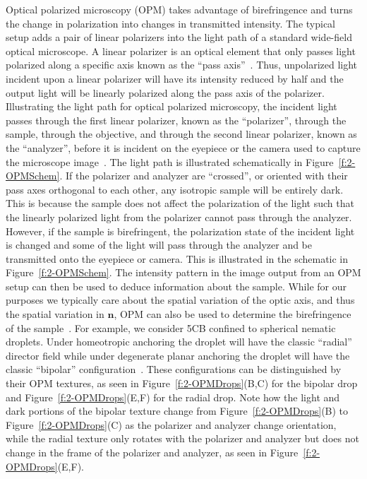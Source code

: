 Optical polarized microscopy (OPM) takes advantage of birefringence and turns the change in polarization into changes in transmitted intensity.
The typical setup adds a pair of linear polarizers into the light path of a standard wide-field optical microscope.
A linear polarizer is an optical element that only passes light polarized along a specific axis known as the ``pass axis''~\cite{RN232}.
Thus, unpolarized light incident upon a linear polarizer will have its intensity reduced by half and the output light will be linearly polarized along the pass axis of the polarizer.
Illustrating the light path for optical polarized microscopy, the incident light passes through the first linear polarizer, known as the ``polarizer'', through the sample, through the objective, and through the second linear polarizer, known as the ``analyzer'', before it is incident on the eyepiece or the camera used to capture the microscope image~\cite{RN232}.
The light path is illustrated schematically in Figure~\ref{f:2-OPMSchem}.
If the polarizer and analyzer are ``crossed'', or oriented with their pass axes orthogonal to each other, any isotropic sample will be entirely dark.
This is because the sample does not affect the polarization of the light such that the linearly polarized light from the polarizer cannot pass through the analyzer.
However, if the sample is birefringent, the polarization state of the incident light is changed and some of the light will pass through the analyzer and be transmitted onto the eyepiece or camera.
This is illustrated in the schematic in Figure~\ref{f:2-OPMSchem}.
The intensity pattern in the image output from an OPM setup can then be used to deduce information about the sample.
While for our purposes we typically care about the spatial variation of the optic axis, and thus the spatial variation in $\mathbf{n}$, OPM can also be used to determine the birefringence of the sample~\cite{RN232}.
For example, we consider 5CB confined to spherical nematic droplets.
Under homeotropic anchoring the droplet will have the classic ``radial'' director field while under degenerate planar anchoring the droplet will have the classic ``bipolar'' configuration~\cite{RN177}.
These configurations can be distinguished by their OPM textures, as seen in Figure~\ref{f:2-OPMDrops}(B,C) for the bipolar drop and Figure~\ref{f:2-OPMDrops}(E,F) for the radial drop.
Note how the light and dark portions of the bipolar texture change from Figure~\ref{f:2-OPMDrops}(B) to Figure~\ref{f:2-OPMDrops}(C) as the polarizer and analyzer change orientation, while the radial texture only rotates with the polarizer and analyzer but does not change in the frame of the polarizer and analyzer, as seen in Figure~\ref{f:2-OPMDrops}(E,F).

